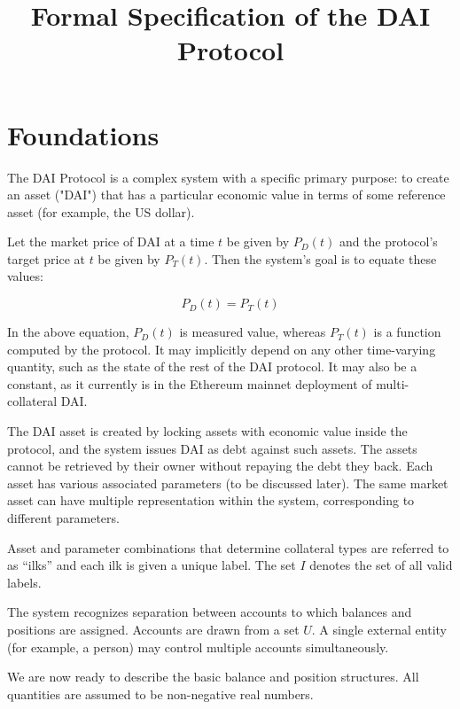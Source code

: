 \documentclass{article}
\begin{document}
\title{Formal Specification of the DAI Protocol}

\maketitle

\section{Foundations}

The DAI Protocol is a complex system with a specific primary purpose: to create an asset ("DAI") that has a particular economic value in terms of some reference asset (for example, the US dollar).

Let the market price of DAI at a time \(t\) be given by \(P_D(t)\) and the protocol's target price at \(t\) be given by \(P_T(t)\). Then the system's goal is to equate these values:

\begin{equation}
    P_D(t) = P_T(t)
\end{equation}

In the above equation, \(P_D(t)\) is measured value, whereas \(P_T(t)\) is a function computed by the protocol. It may implicitly depend on any other time-varying quantity, such as the state of the rest of the
DAI protocol. It may also be a constant, as it currently is in the Ethereum mainnet deployment of multi-collateral DAI.

The DAI asset is created by locking assets with economic value inside the protocol, and the system issues DAI as debt against such assets. The assets cannot be retrieved by their owner without repaying the debt 
they back. Each asset has various associated parameters (to be discussed later). The same market asset can have multiple representation within the system, corresponding to different parameters.

Asset and parameter combinations that determine collateral types are referred to as ``ilks'' and each ilk is given a unique label. The set \(I\) denotes the set of all valid labels.

The system recognizes separation between accounts to which balances and positions are assigned. Accounts are drawn from a set \(U\). A single external entity (for example, a person) may control multiple accounts
simultaneously.

We are now ready to describe the basic balance and position structures. All quantities are assumed to be non-negative real numbers.
\end{document}
